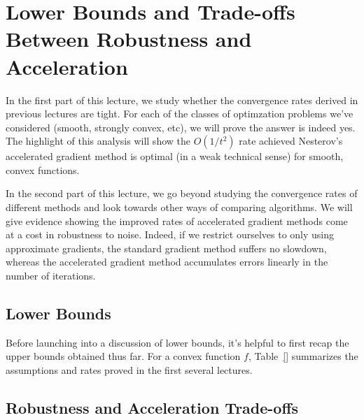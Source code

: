 \section{Lower Bounds and Trade-offs Between Robustness and Acceleration}

In the first part of this lecture, we study whether the convergence rates
derived in previous lectures are tight. For each of the classes of optimzation
problems we've considered (smooth, strongly convex, etc), we will prove the
answer is indeed yes. The highlight of this analysis will show the $O(1/t^2)$
rate achieved Nesterov's accelerated gradient method is optimal (in a weak
technical sense) for smooth, convex functions. 

In the second part of this lecture, we go beyond studying the convergence
rates of different methods and look towards other ways of comparing algorithms.
We will give evidence showing the improved rates of accelerated gradient methods
come at a cost in robustness to noise. Indeed, if we restrict ourselves to
only using approximate gradients, the standard gradient method suffers no
slowdown, whereas the accelerated gradient method accumulates errors linearly in
the number of iterations.

\subsection{Lower Bounds}
Before launching into a discussion of lower bounds, it's helpful to first recap
the upper bounds obtained thus far. For a convex function $f$, Table~\eqref{}
summarizes the assumptions and rates proved in the first several lectures. 









\subsection{Robustness and Acceleration Trade-offs}



